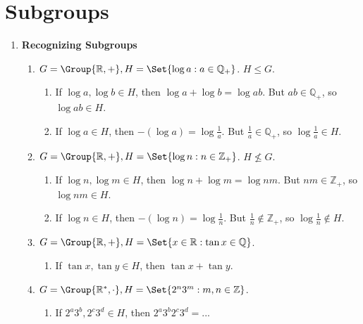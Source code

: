 \setcounter{chapter}{4}
\chapter{Subgroups}
\label{ch:subgroups}

\begin{enumerate}[label={\Alph*.},font={\bfseries}]
\item {\bf Recognizing Subgroups}
  \begin{enumerate}[label={\arabic*},font={\bfseries}]
  \item $G = \Group{\mathbb{R}, +}, H = \Set{\log a : a \in \mathbb{Q}_{+}}$.
    $H \le G$.
    \begin{enumerate}[label={(\roman*)}]
    \item If $\log a, \log b \in H$, then $\log a + \log b = \log ab$. But $ab \in \mathbb{Q}_{+}$, so $\log ab \in H$.
    \item If $\log a \in H$, then $-(\log a) = \log \frac{1}{a}$. But $\frac{1}{a} \in \mathbb{Q}_{+}$, so $\log \frac{1}{a} \in H$.
    \end{enumerate}
  \item $G = \Group{\mathbb{R}, +}, H = \Set{\log n : n \in \mathbb{Z}_{+}}$.
    $H \not\le G$.
    \begin{enumerate}[label={(\roman*)}]
    \item If $\log n, \log m \in H$, then $\log n + \log m = \log nm$. But $nm \in \mathbb{Z}_{+}$, so $\log nm \in H$.
    \item If $\log n \in H$, then $-(\log n) = \log \frac{1}{n}$. But $\frac{1}{n} \not\in \mathbb{Z}_{+}$, so $\log \frac{1}{n} \not\in H$.
    \end{enumerate}
  \item $G = \Group{\mathbb{R}, +}, H = \Set{x \in \mathbb{R} : \tan x \in \mathbb{Q}}$.
    \begin{enumerate}[label={(\roman*)}]
    \item If $\tan x, \tan y \in H$, then $\tan x + \tan y$. 
    \end{enumerate}
  \item $G = \Group{\mathbb{R}^{*}, \cdot}, H = \Set{2^n3^m : m,n \in \mathbb{Z}}$.
    \begin{enumerate}[label={(\roman*)}]
    \item If $2^a3^b, 2^c3^d \in H$, then $2^a3^b2^c3^d = ...$ 

\end{enumerate}
\end{enumerate}
\end{enumerate}
